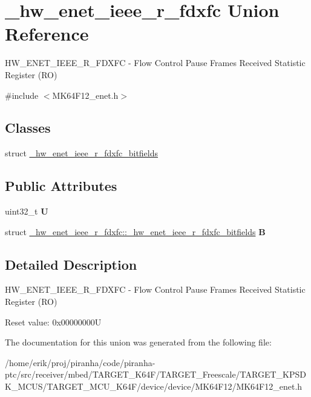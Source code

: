 \hypertarget{union__hw__enet__ieee__r__fdxfc}{}\section{\+\_\+hw\+\_\+enet\+\_\+ieee\+\_\+r\+\_\+fdxfc Union Reference}
\label{union__hw__enet__ieee__r__fdxfc}


H\+W\+\_\+\+E\+N\+E\+T\+\_\+\+I\+E\+E\+E\+\_\+\+R\+\_\+\+F\+D\+X\+FC -\/ Flow Control Pause Frames Received Statistic Register (RO)  




{\ttfamily \#include $<$M\+K64\+F12\+\_\+enet.\+h$>$}

\subsection*{Classes}
\begin{DoxyCompactItemize}
\item 
struct \hyperlink{struct__hw__enet__ieee__r__fdxfc_1_1__hw__enet__ieee__r__fdxfc__bitfields}{\+\_\+hw\+\_\+enet\+\_\+ieee\+\_\+r\+\_\+fdxfc\+\_\+bitfields}
\end{DoxyCompactItemize}
\subsection*{Public Attributes}
\begin{DoxyCompactItemize}
\item 
uint32\+\_\+t {\bfseries U}\hypertarget{union__hw__enet__ieee__r__fdxfc_aa2e98ccc55284baae4c543897e83a196}{}\label{union__hw__enet__ieee__r__fdxfc_aa2e98ccc55284baae4c543897e83a196}

\item 
struct \hyperlink{struct__hw__enet__ieee__r__fdxfc_1_1__hw__enet__ieee__r__fdxfc__bitfields}{\+\_\+hw\+\_\+enet\+\_\+ieee\+\_\+r\+\_\+fdxfc\+::\+\_\+hw\+\_\+enet\+\_\+ieee\+\_\+r\+\_\+fdxfc\+\_\+bitfields} {\bfseries B}\hypertarget{union__hw__enet__ieee__r__fdxfc_acce254bd8c44fca0c249f626735bfcd2}{}\label{union__hw__enet__ieee__r__fdxfc_acce254bd8c44fca0c249f626735bfcd2}

\end{DoxyCompactItemize}


\subsection{Detailed Description}
H\+W\+\_\+\+E\+N\+E\+T\+\_\+\+I\+E\+E\+E\+\_\+\+R\+\_\+\+F\+D\+X\+FC -\/ Flow Control Pause Frames Received Statistic Register (RO) 

Reset value\+: 0x00000000U 

The documentation for this union was generated from the following file\+:\begin{DoxyCompactItemize}
\item 
/home/erik/proj/piranha/code/piranha-\/ptc/src/receiver/mbed/\+T\+A\+R\+G\+E\+T\+\_\+\+K64\+F/\+T\+A\+R\+G\+E\+T\+\_\+\+Freescale/\+T\+A\+R\+G\+E\+T\+\_\+\+K\+P\+S\+D\+K\+\_\+\+M\+C\+U\+S/\+T\+A\+R\+G\+E\+T\+\_\+\+M\+C\+U\+\_\+\+K64\+F/device/device/\+M\+K64\+F12/M\+K64\+F12\+\_\+enet.\+h\end{DoxyCompactItemize}
